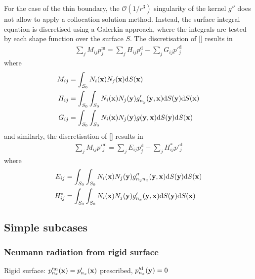 \documentclass[10pt,onecolumn]{article}
\newcommand{\td}{\mathrm{d}}
\begin{document}
For the case of the thin boundary, the $\mathcal{O}(1/r^3)$ singularity of the kernel $g''$ does not allow to apply a collocation solution method. Instead, the surface integral equation is discretised using a Galerkin approach, where the integrals are tested by each shape function over the surface $S$. The discretisation of \eqref{} results in
%
\begin{align}
\sum_{j} M_{ij} p^{\mathrm{m}}_j =
\sum_{j} H_{ij} p^{\mathrm{d}}_j
- \sum_{j} G_{ij}  p'^{\mathrm{d}}_j
\end{align}
%
where
%
\begin{align}
M_{ij} &= \int_{S_0} N_i({\bf x}) N_j({\bf x}) \mathrm{d} S({\bf x}) \\
H_{ij} &= \int_{S_0} \int_{S_0} N_i({\bf x}) N_j({\bf y}) g'_{n_y}({\bf y}, {\bf x}) \td S({\bf y}) \td S({\bf x}) \\
G_{ij} &= \int_{S_0} \int_{S_0} N_i({\bf x}) N_j({\bf y}) g({\bf y}, {\bf x}) \td S({\bf y}) \td S({\bf x})
\end{align}
%
and similarly, the discretisation of \eqref{} results in
%
\begin{align}
\sum_{j} M_{ij} p'^{\mathrm{m}}_j =
\sum_{j} E_{ij} p^{\mathrm{d}}_j - \sum_{j} H^*_{ij}  p'^{\mathrm{d}}_j
\end{align}
%
where
%
\begin{align}
E_{ij} &= \int_{S_0} \int_{S_0} N_i({\bf x}) N_j({\bf y}) g''_{n_y n_x}({\bf y}, {\bf x}) \td S({\bf y}) \td S({\bf x}) \\
H^*_{ij} &= \int_{S_0} \int_{S_0} N_i({\bf x}) N_j({\bf y}) g'_{n_x}({\bf y}, {\bf x}) \td S({\bf y}) \td S({\bf x})
\end{align}



\subsection{Simple subcases}

\subsubsection{Neumann radiation from rigid surface}

Rigid surface: $p'^{\mathrm{m}}_{n_x}({\bf x}) = p'_{n_x}({\bf x})$ prescribed, $p'^{\mathrm{d}}_{n_x}({\bf y}) = 0$
\end{document}
